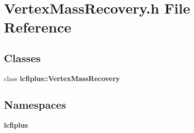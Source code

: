 \section{Vertex\-Mass\-Recovery.\-h File Reference}
\label{VertexMassRecovery_8h}
\subsection*{Classes}
\begin{DoxyCompactItemize}
\item 
class {\bf lcfiplus\-::\-Vertex\-Mass\-Recovery}
\end{DoxyCompactItemize}
\subsection*{Namespaces}
\begin{DoxyCompactItemize}
\item 
{\bf lcfiplus}
\end{DoxyCompactItemize}
